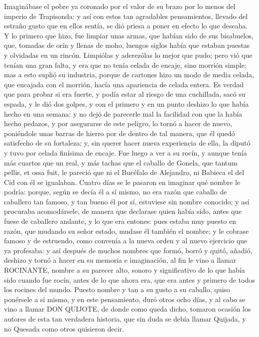 Imaginábase el pobre ya coronado por el valor de su brazo por lo menos
del imperio de Trapisonda: y así con estos tan agradables
pensamientos, llevado del estraño gusto que en ellos sentía, se dió
priesa a poner en efecto lo que deseaba. Y lo primero que hizo, fue
limpiar unas armas, que habían sido de sus bisabuelos, que, tomadas de
orín y llenas de moho, luengos siglos había que estaban puestas y
olvidadas en un rincón. Limpiólas y aderezólas lo mejor que pudo; pero
vió que tenían una gran falta, y era que no tenía celada de encaje,
sino morrión simple; mas a esto suplió su industria, porque de
cartones hizo un modo de media celada, que encajada con el morrión,
hacía una apariencia de celada entera. Es verdad que para probar si
era fuerte, y podía estar al riesgo de una cuchillada, sacó su espada,
y le dió dos golpes, y con el primero y en un punto deshizo lo que
había hecho en una semana: y no dejó de parecerle mal la facilidad con
que la había hecho pedazos, y por asegurarse de este peligro, lo tornó
a hacer de nuevo, poniéndole unas barras de hierro por de dentro de
tal manera, que él quedó satisfecho de su fortaleza; y, sin querer
hacer nueva experiencia de ella, la diputó y tuvo por celada finísima
de encaje. Fue luego a ver a su rocín, y aunque tenía más cuartos que
un real, y más tachas que el caballo de Gonela, que tantum pellis, et
ossa fuit, le pareció que ni el Bucéfalo de Alejandro, ni Babieca el
del Cid con él se igualaban. Cuatro días se le pasaron en imaginar qué
nombre le podría: porque, según se decía él a sí mismo, no era razón
que caballo de caballero tan famoso, y tan bueno él por sí, estuviese
sin nombre conocido; y así procuraba acomodársele, de manera que
declarase quien había sido, antes que fuese de caballero andante, y lo
que era entones: pues estaba muy puesto en razón, que mudando su señor
estado, mudase él también el nombre; y le cobrase famoso y de
estruendo, como convenía a la nueva orden y al nuevo ejercicio que ya
profesaba: y así después de muchos nombres que formó, borró y quitó,
añadió, deshizo y tornó a hacer en su memoria e imaginación, al fin le
vino a llamar ROCINANTE, nombre a su parecer alto, sonoro y
significativo de lo que había sido cuando fue rocín, antes de lo que
ahora era, que era antes y primero de todos los rocines del mundo.
Puesto nombre y tan a su gusto a su caballo, quiso ponérsele a sí
mismo, y en este pensamiento, duró otros ocho días, y al cabo se vino
a llamar DON QUIJOTE, de donde como queda dicho, tomaron ocasión los
autores de esta tan verdadera historia, que sin duda se debía llamar
Quijada, y no Quesada como otros quisieron decir. 

